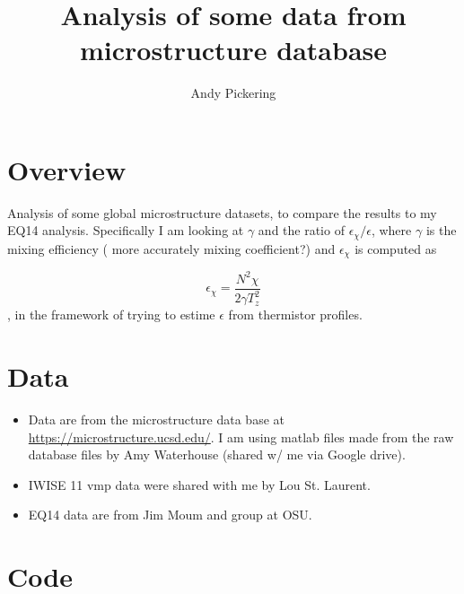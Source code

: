 \documentclass[11pt]{article}
\title{Analysis of some data from microstructure database}
\author{Andy Pickering}
\begin{document}
\maketitle

\tableofcontents
\newpage



\section{Overview}


Analysis of some global microstructure datasets, to compare the results to my EQ14 analysis. Specifically I am looking at $\gamma$ and the ratio of $\epsilon_{\chi}/\epsilon$, where $\gamma$ is the mixing efficiency ( more accurately mixing coefficient?) and $\epsilon_{\chi}$ is computed as 

\begin{equation}
\epsilon_{\chi} = \frac{N^2\chi}{2\gamma T_{z}^{2}}
\end{equation}
, in the framework of trying to estime $\epsilon$ from thermistor profiles.





\section{Data}


\begin{itemize}

\item Data are from the microstructure data base at \url{https://microstructure.ucsd.edu/}. I am using matlab files made from the raw database files by Amy Waterhouse (shared w/ me via Google drive). 

\item IWISE 11 vmp data were shared with me by Lou St. Laurent.

\item EQ14 data are from Jim Moum and group at OSU.

\end{itemize}



\section{Code}
\end{document}

